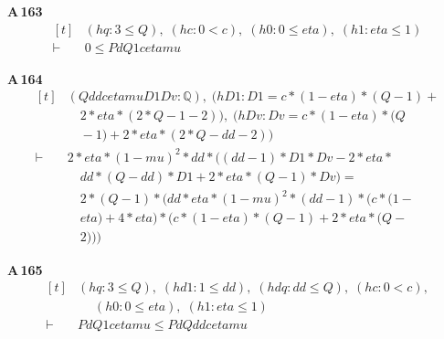 \noindent\textbf{A\,163}\quad{}
{\footnotesize\[ \begin{aligned}[t]
&(\mathit{hq} : 3 \leq \mathit{Q}),\; (\mathit{hc} : 0 < \mathit{c}),\; (\mathit{h0} : 0 \leq \mathit{eta}),\; (\mathit{h1} : \mathit{eta} \leq 1)\\
\vdash\;&0 \leq \mathit{Pd} \mathit{Q} 1 \mathit{c} \mathit{eta} \mathit{mu}
\end{aligned} \]}

\noindent\textbf{A\,164}\quad{}
{\footnotesize\[ \begin{aligned}[t]
&(\mathit{Q} \mathit{dd} \mathit{c} \mathit{eta} \mathit{mu} \mathit{D1} \mathit{Dv} : \mathbb{Q} ),\; (\mathit{hD1} : \mathit{D1} = \mathit{c} * (1 - \mathit{eta}) * (\mathit{Q} - 1) +\\
&\quad 2 * \mathit{eta} * (2 * \mathit{Q} - 1 - 2)),\; (\mathit{hDv} : \mathit{Dv} = \mathit{c} * (1 - \mathit{eta}) * (\mathit{Q}\\
&\quad - 1) + 2 * \mathit{eta} * (2 * \mathit{Q} - \mathit{dd} - 2))\\
\vdash\;&2 * \mathit{eta} * (1 - \mathit{mu}) ^{2} * \mathit{dd} * ((\mathit{dd} - 1) * \mathit{D1} * \mathit{Dv} - 2 * \mathit{eta} *\\
&\quad \mathit{dd} * (\mathit{Q} - \mathit{dd}) * \mathit{D1} + 2 * \mathit{eta} * (\mathit{Q} - 1) * \mathit{Dv}) =\\
&\quad 2 * (\mathit{Q} - 1) * (\mathit{dd} * \mathit{eta} * (1 - \mathit{mu}) ^{2} * (\mathit{dd} - 1) * (\mathit{c} * (1 -\\
&\quad \mathit{eta}) + 4 * \mathit{eta}) * (\mathit{c} * (1 - \mathit{eta}) * (\mathit{Q} - 1) + 2 * \mathit{eta} * (\mathit{Q} -\\
&\quad 2)))
\end{aligned} \]}

\noindent\textbf{A\,165}\quad{}
{\footnotesize\[ \begin{aligned}[t]
&(\mathit{hq} : 3 \leq \mathit{Q}),\; (\mathit{hd1} : 1 \leq \mathit{dd}),\; (\mathit{hdq} : \mathit{dd} \leq \mathit{Q}),\; (\mathit{hc} : 0 < \mathit{c}),\\
&\quad \; (\mathit{h0} : 0 \leq \mathit{eta}),\; (\mathit{h1} : \mathit{eta} \leq 1)\\
\vdash\;&\mathit{Pd} \mathit{Q} 1 \mathit{c} \mathit{eta} \mathit{mu} \leq \mathit{Pd} \mathit{Q} \mathit{dd} \mathit{c} \mathit{eta} \mathit{mu}
\end{aligned} \]}

